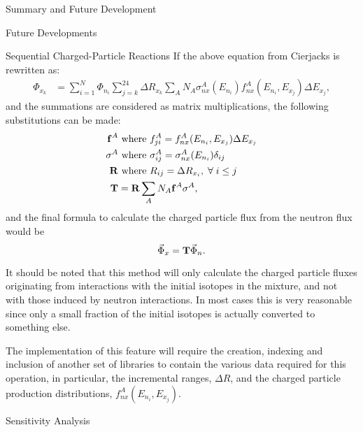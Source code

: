 \begin{chapter}{Summary and Future Development}
\begin{section}{Future Developments}
\begin{subsection}{Sequential Charged-Particle Reactions}
      If the above equation from Cierjacks\cite{sequential} is
      rewritten as:
      \begin{equation}
        \begin{split}
          \Phi_{x_k} &= \sum_{i=1}^N \Phi_{n_i} \sum_{j=k}^{24} \Delta R_{x_k}
          \sum_A N_A \sigma_{nx}^A(E_{n_i}) f_{nx}^A(E_{n_i},E_{x_j}) \Delta E_{x_j},
        \end{split}
      \end{equation}
      and the summations are considered as matrix multiplications, the
      following substitutions can be made:
      \begin{equation}
        \begin{split}
          \mbox{$\mathbf{f}$}^A &\text{ where } f_{ji}^A = f_{nx}^A(E_{n_i},E_{x_j})\Delta E_{x_j}\\
          \mbox{$\mathbf{\sigma}$}^A &\text{ where } \sigma_{ij}^A = \sigma_{nx}^A(E_{n_i}) \delta_{ij}\\
          \mbox{$\mathbf{R}$} &\text{ where } R_{ij} = \Delta R_{x_i},\; \forall\; i \leq j\\
          \mbox{$\mathbf{T}$} &= \mbox{$\mathbf{R}$} \sum_A N_A \mbox{$\mathbf{f}$}^A \mbox{$\mathbf{\sigma}$}^A,
        \end{split}
      \end{equation}
      and the final formula to calculate the charged particle flux from
      the neutron flux would be
      \begin{equation}
        \vec{\Phi}_x = \mbox{$\mathbf{T}$}\vec{\Phi}_n.
      \end{equation}
      
      It should be noted that this method will only calculate the
      charged particle fluxes originating from interactions with the
      initial isotopes in the mixture, and not with those induced by
      neutron interactions.  In most cases this is very reasonable
      since only a small fraction of the initial isotopes is actually
      converted to something else.
    
      The implementation of this feature will require the creation,
      indexing and inclusion of another set of libraries to contain
      the various data required for this operation, in particular, the
      incremental ranges, $\Delta R$, and the charged particle
      production distributions, $f_{nx}^A(E_{n_i},E_{x_j})$.
    \end{subsection}

    \begin{subsection}{Sensitivity Analysis}\label{ssec:future.data.sens}
    

\end{subsection}
\end{section}
\end{chapter}
